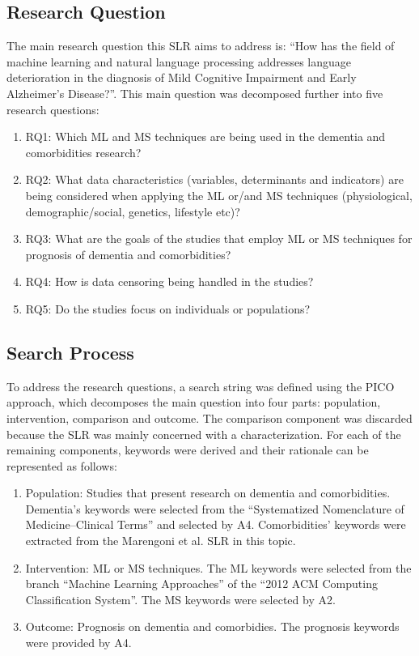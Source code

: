 \documentclass[12pt]{article}
\begin{document}
\subsection{Research Question}
The main research question this SLR aims to address is: “How has the field of machine learning and natural language processing addresses language deterioration in the diagnosis of Mild Cognitive Impairment and Early Alzheimer's Disease?”. This main question was decomposed further into five research questions:
\begin{enumerate}
	\item RQ1: Which ML and MS techniques are being used in the dementia and comorbidities research?
	\item RQ2: What data characteristics (variables, determinants and indicators) are being considered when applying the ML or/and MS techniques (physiological, demographic/social, genetics, lifestyle etc)?
	\item RQ3: What are the goals of the studies that employ ML or MS techniques for prognosis of dementia and comorbidities?
	\item RQ4: How is data censoring being handled in the studies?
	\item RQ5: Do the studies focus on individuals or populations?
\end{enumerate}
\subsection{Search Process}

To address the research questions, a search string was defined using the PICO approach, which decomposes the main question into four parts: population, intervention, comparison and outcome. The comparison component was discarded because the SLR was mainly concerned with a characterization. For each of the remaining components, keywords were derived and their rationale can be represented as follows:
\begin{enumerate}
	\item Population: Studies that present research on dementia and comorbidities. Dementia’s keywords were selected from the “Systematized Nomenclature of Medicine–Clinical Terms” and selected by A4. Comorbidities’ keywords were extracted from the Marengoni et al. SLR in this topic.
	\item Intervention: ML or MS techniques. The ML keywords were selected from the branch “Machine Learning Approaches” of the “2012 ACM Computing Classification System”. The MS keywords were selected by A2.
	\item Outcome: Prognosis on dementia and comorbidies. The prognosis keywords were provided
by A4.
\end{enumerate}
\end{document}
